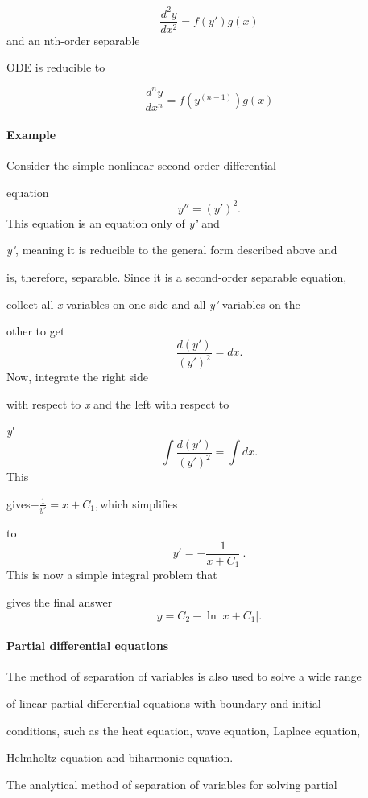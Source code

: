 $$\frac{d^2y}{dx^2}=f\left(y'\right)g(x)$$ and an nth-order separable

ODE is reducible to



$$\frac{d^ny}{dx^n}=f\!\left(y^{(n-1)}\right)g(x)$$



\paragraph{Example}



Consider the simple nonlinear second-order differential

equation$$y''=(y')^2.$$This equation is an equation only of \textit{y\'\'} and

\textit{y\'}, meaning it is reducible to the general form described above and

is, therefore, separable. Since it is a second-order separable equation,

collect all \textit{x} variables on one side and all \textit{y\'} variables on the

other to get$$\frac{d(y')}{(y')^2}=dx.$$Now, integrate the right side

with respect to \textit{x} and the left with respect to

\textit{y}\'$$\int \frac{d(y')}{(y')^2}=\int dx.$$This

gives$-\frac{1}{y'}=x+C_1,$which simplifies

to$$y'=-\frac{1}{x+C_1}~.$$This is now a simple integral problem that

gives the final answer$$y=C_2-\ln|x+C_1|.$$



\paragraph{Partial differential equations}



The method of separation of variables is also used to solve a wide range

of linear partial differential equations with boundary and initial

conditions, such as the heat equation, wave equation, Laplace equation,

Helmholtz equation and biharmonic equation.



The analytical method of separation of variables for solving partial

